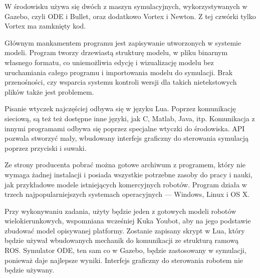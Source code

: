 	W środowisku używa się dwóch z maszyn symulacyjnych, wykorzystywanych w Gazebo, czyli ODE i Bullet, oraz dodatkowo Vortex i Newton. Z tej czwórki tylko Vortex ma zamknięty kod.

	Głównym mankamentem programu jest zapisywanie utworzonych w systemie modeli.
	Program tworzy drzewiastą strukturę modelu, w pliku binarnym własnego formatu, co uniemożliwia edycję i wizualizację modelu bez uruchamiania całego programu 
	i importowania modelu do symulacji.
	Brak przenośności, czy wsparcia systemu kontroli wersji dla takich nietekstowych plików także jest problemem.

	Pisanie wtyczek najczęściej odbywa się w języku Lua. Poprzez komunikację sieciową, są też też dostępne inne języki, jak C, Matlab, Java, itp.
	Komunikacja z innymi programami odbywa się poprzez specjalne wtyczki do środowiska.
	API pozwala stworzyć mały, wbudowany interfejs graficzny do sterowania symulacją poprzez przyciski i suwaki.

	Ze strony producenta pobrać można gotowe archiwum z programem, który nie wymaga żadnej instalacji i posiada wszystkie potrzebne zasoby do pracy i nauki, 
	jak przykładowe modele istniejących komercyjnych robotów.
	Program działa w trzech najpopularniejszych systemach operacyjnych --- Windows, Linux i OS X.
	
	Przy wykonywaniu zadania, użyty będzie jeden z gotowych modeli robotów wielokierunkowych, wspomniana wcześniej Kuka Youbot, aby na jego podstawie zbudować model opisywanej platformy. Zostanie zapisany skrypt w Lua, który będzie używał wbudowanych mechanik do komunikacji ze strukturą ramową ROS. 
	Symulator ODE, ten sam co w Gazebo, będzie zastosowany w symulacji, ponieważ daje najlepsze wyniki. Interfejs graficzny do sterowania robotem nie będzie używany.

